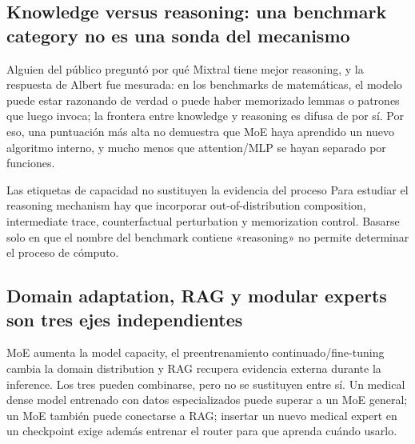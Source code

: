 \documentclass[a4paper]{article}
\begin{document}

\subsection{Knowledge versus reasoning: una benchmark category no es una sonda del mecanismo}

Alguien del público preguntó por qué Mixtral tiene mejor reasoning, y la respuesta de Albert fue mesurada: en los benchmarks de matemáticas, el modelo puede estar razonando de verdad o puede haber memorizado lemmas o patrones que luego invoca; la frontera entre knowledge y reasoning es difusa de por sí. Por eso, una puntuación más alta no demuestra que MoE haya aprendido un nuevo algoritmo interno, y mucho menos que attention/MLP se hayan separado por funciones.

\begin{warningbox}{Las etiquetas de capacidad no sustituyen la evidencia del proceso}
Para estudiar el reasoning mechanism hay que incorporar out-of-distribution composition, intermediate trace, counterfactual perturbation y memorization control. Basarse solo en que el nombre del benchmark contiene «reasoning» no permite determinar el proceso de cómputo.
\end{warningbox}


\subsection{Domain adaptation, RAG y modular experts son tres ejes independientes}

MoE aumenta la model capacity, el preentrenamiento continuado/fine-tuning cambia la domain distribution y RAG recupera evidencia externa durante la inference. Los tres pueden combinarse, pero no se sustituyen entre sí. Un medical dense model entrenado con datos especializados puede superar a un MoE general; un MoE también puede conectarse a RAG; insertar un nuevo medical expert en un checkpoint exige además entrenar el router para que aprenda cuándo usarlo.
\end{document}
